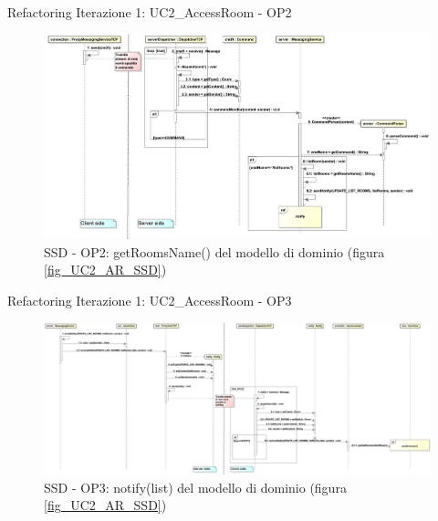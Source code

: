 \documentclass[t]{beamer} %
\begin{document}
\begin{frame} {Refactoring Iterazione 1: UC2\_AccessRoom - OP2}
   \begin{figure}
     \includegraphics[scale=0.18]{image_astah/Iteration_1_DesignModel_Refactored/UC2_AccessRoom_SSD_2_getRoomsName.png}{\centering}
     \caption{SSD - OP2: getRoomsName() del modello di dominio (figura \ref{fig_UC2_AR_SSD}) }
     \label{fig_UC2_SSDR_AC_2} 
   \end{figure}
\end{frame}

\begin{frame} {Refactoring Iterazione 1: UC2\_AccessRoom - OP3}
   \begin{figure}
     \includegraphics[scale=0.16]{image_astah/Iteration_1_DesignModel_Refactored/UC2_AccessRoom_SSD_3_notify.png}{\centering}
     \caption{SSD - OP3: notify(list) del modello di dominio (figura \ref{fig_UC2_AR_SSD})}
     \label{fig_UC2_SSDR_AC_3} 
   \end{figure}
\end{frame}
\end{document}
